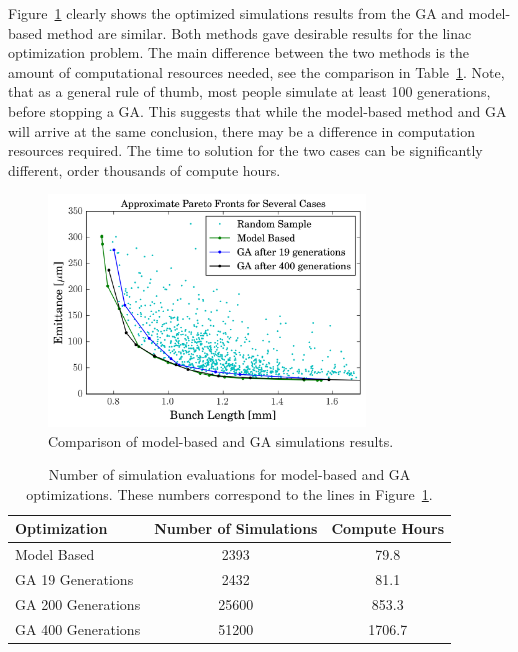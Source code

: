 Figure~\ref{fig:GAvsModel} clearly shows the optimized simulations results from 
the GA and model-based method are similar. Both methods gave desirable 
results for the linac optimization problem. 
The main difference between the two methods is the amount of computational 
resources needed, see the comparison in Table~\ref{tab:optcompare}.
Note, that as a general rule of thumb, most people simulate at least 100 generations, before stopping a GA.
This suggests that while the model-based method and GA will arrive at 
the same conclusion, there may be a difference in computation resources required. 
The time to solution for the two cases can be significantly different, 
order thousands of compute hours.
\begin{figure}
	\centering
	\includegraphics[width=0.75\textwidth]{./images/model_vs_ga}
	\caption{Comparison of model-based and GA simulations results.}
	\label{fig:GAvsModel}
\end{figure}
\begin{table}%
	\caption{Number of simulation evaluations for model-based and GA optimizations.
	These numbers correspond to the lines in Figure~\ref{fig:GAvsModel}.}
	\label{tab:optcompare}
	\begin{center}
		\begin{tabular}{lcc}
			\toprule
			\toprule
			\textbf{Optimization} & \textbf{Number of Simulations} & \textbf{Compute Hours} \\
			\midrule
			Model Based  		& 2393  & 79.8 \\
			GA 19 Generations 	& 2432  & 81.1 \\
			GA 200 Generations 	& 25600 & 853.3\\
			GA 400 Generations 	& 51200 & 1706.7\\
			\bottomrule
		\end{tabular}
	\end{center}
\end{table}

